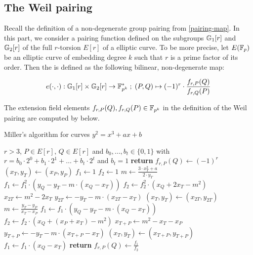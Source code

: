 \subsection{The Weil pairing} Recall the definition of a non-degenerate group pairing from \ref{pairing-map}. In this part, we consider a pairing function defined on
the subgroups $\mathbb{G}_1[r]$ and $\mathbb{G}_2[r]$ of the full $r$-torsion $E[r]$ of a  elliptic curve. To be more precise, let $E(\mathbb{F}_p)$ be an elliptic curve of embedding degree $k$ such that $r$ is a prime factor of its order. Then the  is defined as the following bilinear, non-degenerate map:

\begin{equation}\label{eq:weil-pairing}
e(\cdot,\cdot) : \mathbb{G}_1[r] \times \mathbb{G}_2[r] \to \mathbb{F}^*_{p^k}\; ;\; 
(P,Q)\mapsto (-1)^r \cdot \frac{f_{r,P}(Q)}{f_{r,Q}(P)}
\end{equation} 

The extension field elements $f_{r,P}(Q), f_{r,Q}(P)\in \mathbb{F}_{p^k}$ in the definition of the Weil pairing are computed by  below.

\begin{algorithm}\caption{Miller's algorithm for  curves $y^2 = x^3 +ax +b$}
\begin{algorithmic}[0]
\Require $r>3$, $P \in E[r]$, $Q\in E[r]$ and
\State $b_0,\ldots, b_t\in \{0,1\}$ with $r= b_0\cdot 2^0 + b_1\cdot 2^1 + \ldots + b_t\cdot 2^t$ and $b_t=1$
	\State \textbf{return} $f_{r,P}(Q) \gets (-1)^r$
\EndIf
\State $(x_T,y_T) \gets (x_P,y_P)$
\State $f_1\gets 1$
\State $f_2\gets 1$
	\State $m \gets \frac{3\cdot x_T^2+a}{2\cdot y_T}$	
    \State $f_1 \gets f_1^2\cdot (y_Q - y_T - m\cdot(x_Q-x_T))$
	\State $f_2 \gets f_2^2\cdot (x_Q + 2x_T -m^2)$
	\State $x_{2T} \gets m^2 - 2 x_T$
	\State $y_{2T} \gets -y_T - m\cdot (x_{2T}-x_T)$
	\State $(x_T,y_T)\gets (x_{2T},y_{2T})$ 
		\State $m \gets \frac{y_T -y_P}{x_T - x_P}$
		\State $f_1 \gets f_1\cdot (y_Q -y_T -m\cdot (x_Q - x_T))$
		\State $f_2 \gets f_2\cdot (x_Q + (x_P+x_T) - m^2)$
		\State $x_{T+P} \gets m^2 -x_T -x_P$
		\State $y_{T+P}\gets -y_T - m\cdot (x_{T+P}-x_T)$
		\State $(x_T,y_T)\gets (x_{T+P},y_{T+P})$
	\EndIf
\EndFor
\State $f_1 \gets f_1\cdot (x_Q - x_T)$
\State \textbf{return} $f_{r,P}(Q) \gets \frac{f_1}{f_2}$
\EndProcedure
\end{algorithmic}
\end{algorithm}


